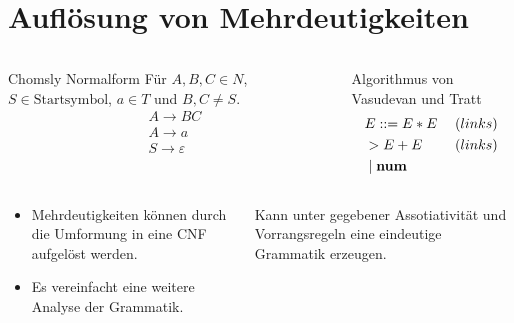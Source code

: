 \documentclass[t]{beamer}
\renewcommand{\Coloneqq}{\mathrel{\mathop{::}}=}
\begin{document}
	\section{Auflösung von Mehrdeutigkeiten}\label{sec:auflsung-von-mehrdeutigkeiten}
	\begin{frame}
		\vspace{-1em}
		\begin{columns}[T]
			\begin{block}{Chomsly Normalform}
				Für $A,B,C \in N$, $S \in \text{Startsymbol}$, $a \in T$ und $B,C \neq S$. \\
				\begin{align*}
					& A \rightarrow BC \\
					& A \rightarrow a \\
					& S \rightarrow \varepsilon
				\end{align*}
			\end{block}
			\begin{block}{Algorithmus von Vasudevan und Tratt}
				\begin{align*}
					& E \Coloneqq E * E \phantom{|} & (links) \\
					& > E + E & (links) \\
					& \phantom{|} | \phantom{|} \bold{num}
				\end{align*}
			\end{block}
		\end{columns}
		\vspace{1em}
		\begin{columns}[T]
			\begin{exampleblock}{}
				\begin{itemize}
					\item Mehrdeutigkeiten können durch die Umformung in eine CNF aufgelöst werden.\cite{kemp1974}
					\item Es vereinfacht eine weitere Analyse der Grammatik.
				\end{itemize}
			\end{exampleblock}
			\begin{exampleblock}{}
				Kann unter gegebener Assotiativität und Vorrangsregeln eine eindeutige Grammatik erzeugen.\cite{springer2013}
			\end{exampleblock}
		\end{columns}
	\end{frame}
\end{document}
